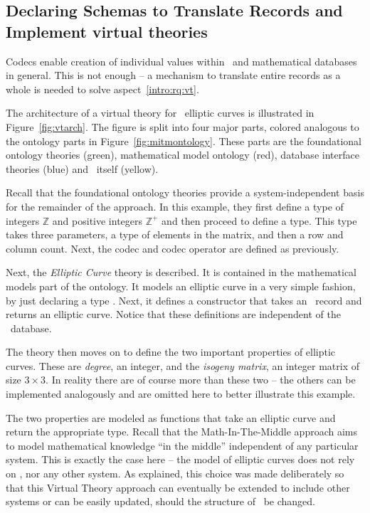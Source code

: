\subsection{Declaring Schemas to Translate Records and Implement virtual theories}\label{sec:vt:schemas}

%
Codecs enable creation of individual values within \lmfdb\ and mathematical databases in general. 
This is not enough -- a mechanism to translate entire records as a whole is needed to solve aspect~\ref{intro:rq:vt}. 

The architecture of a virtual theory for \lmfdb\ elliptic curves is illustrated in Figure~\ref{fig:vtarch}. 
The figure is split into four major parts, colored analogous to the ontology parts in Figure~\ref{fig:mitmontology}. 
These parts are the foundational ontology theories (green), mathematical model ontology (red), database interface theories (blue) and \lmfdb\ itself (yellow). 

Recall that the foundational ontology theories provide a system-independent basis for the remainder of the approach. 
In this example, they first define a type of integers $\mathbb{Z}$ and positive integers $\mathbb{Z}^{+}$ and then proceed to define a  type. 
This type takes three parameters, a type of elements in the matrix, and then a row and column count. 
Next, the codec  and codec operator  are defined as previously. 

Next, the \textit{Elliptic Curve} theory is described. 
It is contained in the mathematical models part of the ontology. 
It models an elliptic curve in a very simple fashion, by just declaring a type . 
Next, it defines a  constructor that takes an \mmt\ record and returns an elliptic curve. 
Notice that these definitions are independent of the \lmfdb\ database. 

The theory then moves on to define the two important properties of elliptic curves. 
These are \textit{degree}, an integer, and the \textit{isogeny matrix}, an integer matrix of size $3 \times 3$. 
In reality there are of course more than these two -- the others can be implemented analogously and are omitted here to better illustrate this example. 

The two properties are modeled as functions that take an elliptic curve and return the appropriate type. 
Recall that the Math-In-The-Middle approach aims to model mathematical knowledge ``in the middle'' independent of any particular system.  
This is exactly the case here -- the model of elliptic curves does not rely on \lmfdb, nor any other system. 
As explained, this choice was made deliberately so that this Virtual Theory approach can eventually be extended to include other systems or can be easily updated, should the structure of \lmfdb\ be changed. 

